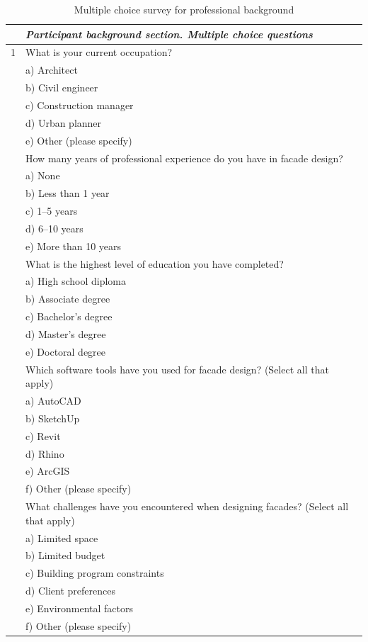 \begin{table}[htb]
    \centering
    \footnotesize
    \caption{Multiple choice survey for professional background}
    \label{tab:BackgroundSurvey}
    \begin{tabularx}{\linewidth}{p{0.125cm}X}
        \toprule
        & \textit{Participant background section. Multiple choice questions} \\
        \midrule
        1 & What is your current occupation? \\
        & a) Architect \\
        & b) Civil engineer \\
        & c) Construction manager \\
        & d) Urban planner \\
        & e) Other (please specify) \\
        \addlinespace
        2 & How many years of professional experience do you have in facade design? \\
        & a) None \\
        & b) Less than 1 year \\
        & c) 1--5 years \\
        & d) 6--10 years \\
        & e) More than 10 years \\
        \addlinespace
        3 & What is the highest level of education you have completed? \\
        & a) High school diploma \\
        & b) Associate degree \\
        & c) Bachelor's degree \\
        & d) Master's degree \\
        & e) Doctoral degree \\
        \addlinespace
        4 & Which software tools have you used for facade design? (Select all that apply) \\
        & a) AutoCAD \\
        & b) SketchUp \\
        & c) Revit \\
        & d) Rhino \\
        & e) ArcGIS \\
        & f) Other (please specify) \\
        \addlinespace
        5 & What challenges have you encountered when designing facades? (Select all that apply) \\
        & a) Limited space \\
        & b) Limited budget \\
        & c) Building program constraints \\
        & d) Client preferences \\
        & e) Environmental factors \\
        & f) Other (please specify) \\

        \bottomrule

    \end{tabularx}
\end{table}

